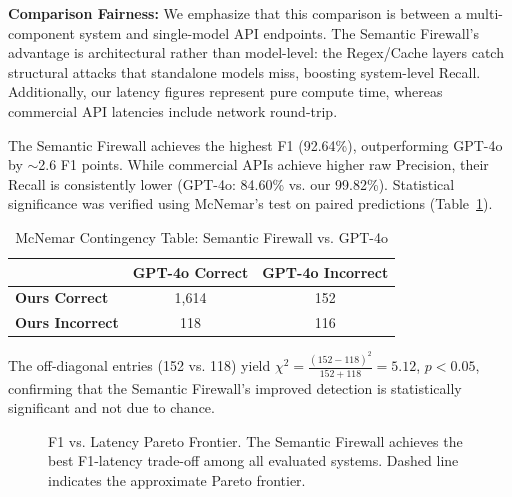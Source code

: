 \documentclass[conference]{IEEEtran}
\begin{document}
\textbf{Comparison Fairness:} We emphasize that this comparison is between a multi-component system and single-model API endpoints. The Semantic Firewall's advantage is architectural rather than model-level: the Regex/Cache layers catch structural attacks that standalone models miss, boosting system-level Recall. Additionally, our latency figures represent pure compute time, whereas commercial API latencies include network round-trip.

The Semantic Firewall achieves the highest F1 (92.64\%), outperforming GPT-4o by $\sim$2.6 F1 points. While commercial APIs achieve higher raw Precision, their Recall is consistently lower (GPT-4o: 84.60\% vs. our 99.82\%). Statistical significance was verified using McNemar's test on paired predictions (Table~\ref{tab:mcnemar}).

\begin{table}[htbp]
\centering
\caption{McNemar Contingency Table: Semantic Firewall vs. GPT-4o}
\label{tab:mcnemar}
\begin{tabular}{@{}lcc@{}}
\toprule
 & \textbf{GPT-4o Correct} & \textbf{GPT-4o Incorrect} \\
\midrule
\textbf{Ours Correct} & 1,614 & 152 \\
\textbf{Ours Incorrect} & 118 & 116 \\
\bottomrule
\end{tabular}
\end{table}

The off-diagonal entries (152 vs. 118) yield $\chi^2 = \frac{(152-118)^2}{152+118} = 5.12$, $p < 0.05$, confirming that the Semantic Firewall's improved detection is statistically significant and not due to chance.

\begin{figure}[htbp]
\centering
{}
\caption{F1 vs. Latency Pareto Frontier. The Semantic Firewall achieves the best F1-latency trade-off among all evaluated systems. Dashed line indicates the approximate Pareto frontier.}
\label{fig:pareto}
\end{figure}
\end{document}

